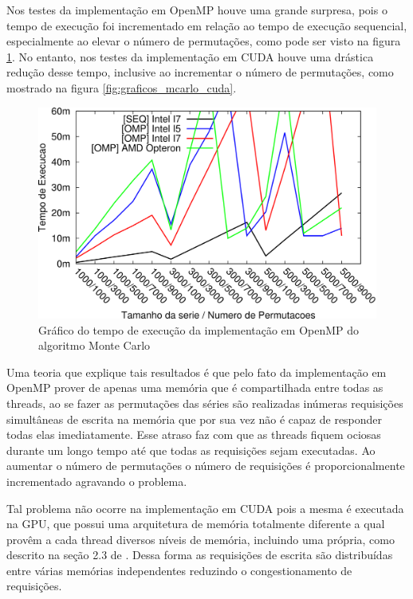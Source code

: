 Nos testes da implementação em OpenMP houve uma grande surpresa, pois o tempo de execução foi incrementado em relação ao tempo de execução sequencial, especialmente ao elevar o número de permutações, como pode ser visto na figura \ref{fig:grafico_mcarlo_omp}. No entanto, nos testes da implementação em CUDA houve uma drástica redução desse tempo, inclusive ao incrementar o número de permutações, como mostrado na figura \ref{fig:graficos_mcarlo_cuda}.

\begin{figure}[H]
\centering
\includegraphics[]{Imagens/graficos_mcarlo/mcarlo_omp.png}
\caption{Gráfico do tempo de execução da implementação em OpenMP do algoritmo Monte Carlo}
\label{fig:grafico_mcarlo_omp}
\end{figure}

Uma teoria que explique tais resultados é que pelo fato da implementação em OpenMP prover de apenas uma memória que é compartilhada entre todas as threads, ao se fazer as permutações das séries são realizadas inúmeras requisições simultâneas de escrita na memória que por sua vez não é capaz de responder todas elas imediatamente. Esse atraso faz com que as threads fiquem ociosas durante um longo tempo até que todas as requisições sejam executadas. Ao aumentar o número de permutações o número de requisições é proporcionalmente incrementado agravando o problema.

Tal problema não ocorre na implementação em CUDA pois a mesma é executada na GPU, que possui uma arquitetura de memória totalmente diferente a qual provêm a cada thread diversos níveis de memória, incluindo uma própria, como descrito na seção 2.3 de \cite{cuda_guide}. Dessa forma as requisições de escrita são distribuídas entre várias memórias independentes reduzindo o congestionamento de requisições.

